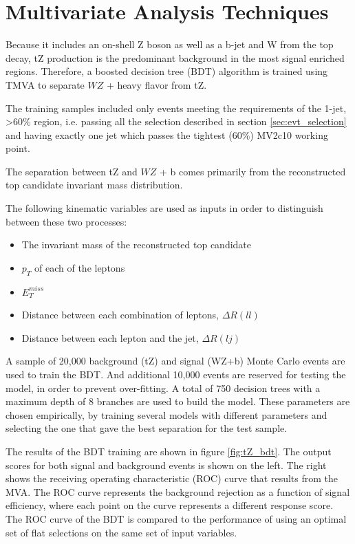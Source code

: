 \documentclass[NOTE, atlasdraft=true, texlive=2016, UKenglish]{\ATLASLATEXPATH atlasdoc}
\begin{document}


\section{Multivariate Analysis Techniques}
\label{sec:tZ_bdt}
Because it includes an on-shell Z boson as well as a b-jet and W from the top decay, tZ production is the predominant background in the most signal enriched regions. Therefore, a boosted decision tree (BDT) algorithm is trained using TMVA \cite{TMVA_guide} to separate $WZ$ + heavy flavor from tZ.

The training samples included only events meeting the requirements of the 1-jet, >60\% region, i.e. passing all the selection described in section \ref{sec:evt_selection} and having exactly one jet which passes the tightest (60\%) MV2c10 working point.

The separation between tZ and $WZ$ + b comes primarily from the reconstructed top candidate invariant mass distribution. 

The following kinematic variables are used as inputs in order to distinguish between these two processes:
 
 \begin{itemize}
     \item The invariant mass of the reconstructed top candidate
     \item $p_T$ of each of the leptons
     \item $E_T^{miss}$
     \item Distance between each combination of leptons, $\Delta R (ll)$
     \item Distance between each lepton and the jet, $\Delta R (lj)$
 \end{itemize}

A sample of 20,000 background (tZ) and signal (WZ+b) Monte Carlo events are used to train the BDT. And additional 10,000 events are reserved for testing the model, in order to prevent over-fitting. A total of 750 decision trees with a maximum depth of 8 branches are used to build the model. These parameters are chosen empirically, by training several models with different parameters and selecting the one that gave the best separation for the test sample. 

The results of the BDT training are shown in figure \ref{fig:tZ_bdt}. The output scores for both signal and background events is shown on the left. The right shows the receiving operating characteristic (ROC) curve that results from the MVA. The ROC curve represents the background rejection as a function of signal efficiency, where each point on the curve represents a different response score. The ROC curve of the BDT is compared to the performance of using an optimal set of flat selections on the same set of input variables.
\end{document}
